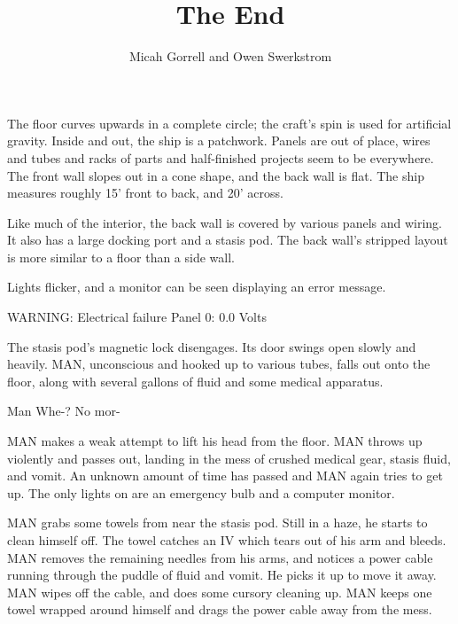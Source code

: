 \documentclass{screenplay}
\title{The End}
\author{Micah Gorrell and Owen Swerkstrom}
\begin{document}
\coverpage
\fadein
{}
The floor curves upwards in a complete circle; the craft's spin is used for artificial gravity.  Inside and out, the ship is a patchwork.  Panels are out of place, wires and tubes and racks of parts and half-finished projects seem to be everywhere.  The front wall slopes out in a cone shape, and the back wall is flat.  The ship measures roughly 15' front to back, and 20' across.

Like much of the interior, the back wall is covered by various panels and wiring.  It also has a large docking port and a stasis pod.  The back wall's stripped layout is more similar to a floor than a side wall.

Lights flicker, and a monitor can be seen displaying an error message.
\begin{dialogue}{}
WARNING: Electrical failure
Panel 0: 0.0 Volts
\end{dialogue}
The stasis pod's magnetic lock disengages.  Its door swings open slowly and heavily.  MAN, unconscious and hooked up to various tubes, falls out onto the floor, along with several gallons of fluid and some medical apparatus.
\begin{dialogue}{Man}
Whe-?  No mor-
\end{dialogue}
MAN makes a weak attempt to lift his head from the floor.  MAN throws up violently and passes out, landing in the mess of crushed medical gear, stasis fluid, and vomit.
\fadeout
\fadein
An unknown amount of time has passed and MAN again tries to get up.  The only lights on are an emergency bulb and a computer monitor.

MAN grabs some towels from near the stasis pod.  Still in a haze, he starts to clean himself off.  The towel catches an IV which tears out of his arm and bleeds.  MAN removes the remaining needles from his arms, and notices a power cable running through the puddle of fluid and vomit.  He picks it up to move it away.  MAN wipes off the cable, and does some cursory cleaning up.  MAN keeps one towel wrapped around himself and drags the power cable away from the mess.
\end{document}
